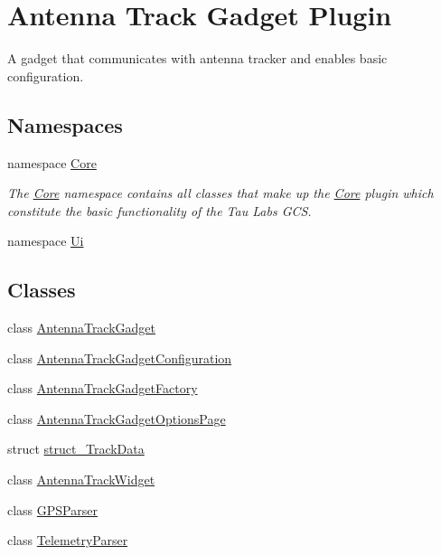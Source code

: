 \hypertarget{group___antenna_track_gadget_plugin}{\section{Antenna Track Gadget Plugin}
\label{group___antenna_track_gadget_plugin}
}


A gadget that communicates with antenna tracker and enables basic configuration.  


\subsection*{Namespaces}
\begin{DoxyCompactItemize}
\item 
namespace \hyperlink{namespace_core}{Core}
\begin{DoxyCompactList}\small\item\em The \hyperlink{namespace_core}{Core} namespace contains all classes that make up the \hyperlink{namespace_core}{Core} plugin which constitute the basic functionality of the Tau Labs G\-C\-S. \end{DoxyCompactList}\item 
namespace \hyperlink{namespace_ui}{Ui}
\end{DoxyCompactItemize}
\subsection*{Classes}
\begin{DoxyCompactItemize}
\item 
class \hyperlink{class_antenna_track_gadget}{Antenna\-Track\-Gadget}
\item 
class \hyperlink{class_antenna_track_gadget_configuration}{Antenna\-Track\-Gadget\-Configuration}
\item 
class \hyperlink{class_antenna_track_gadget_factory}{Antenna\-Track\-Gadget\-Factory}
\item 
class \hyperlink{class_antenna_track_gadget_options_page}{Antenna\-Track\-Gadget\-Options\-Page}
\item 
struct \hyperlink{structstruct___track_data}{struct\-\_\-\-Track\-Data}
\item 
class \hyperlink{class_antenna_track_widget}{Antenna\-Track\-Widget}
\item 
class \hyperlink{class_g_p_s_parser}{G\-P\-S\-Parser}
\item 
class \hyperlink{class_telemetry_parser}{Telemetry\-Parser}
\end{DoxyCompactItemize}
